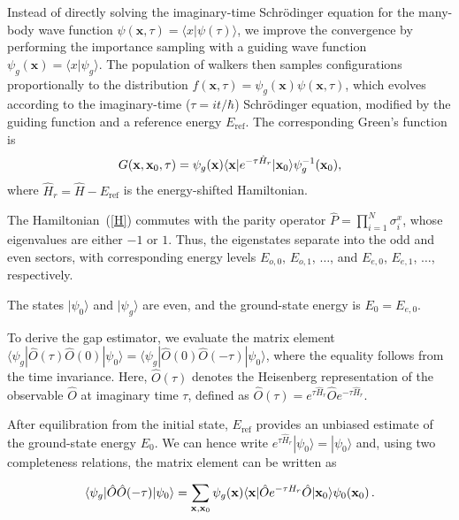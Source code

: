 \documentclass[aps,prl,twocolumn,superscriptaddress,nofootinbib]{revtex4-2}
\begin{document}
Instead of directly solving the imaginary-time Schrödinger equation for the many-body wave function $\psi({\mathbf x},\tau) = \langle x | \psi(\tau)\rangle$, we improve the convergence by performing the importance sampling with a guiding wave function $\psi_g({\mathbf x})=\langle x | \psi_g\rangle$.
The population of walkers then samples configurations proportionally to the
distribution $f({\mathbf x},\tau)=\psi_g({\mathbf x})\psi({\mathbf x},\tau)$, which evolves according to the imaginary-time ($\tau=it/\hbar$) Schrödinger equation, modified by the guiding function and a reference energy $E_{\mathrm{ref}}$.
The corresponding Green's function is
\begin{equation}
G({\mathbf x},{\mathbf x}_0,\tau)=\psi_g({\bf x})\langle{\mathbf x}|e^{-\tau \hat{H}_r}|{\mathbf x}_0\rangle \psi_g^{-1}({\bf x}_0),
\label{eqG}
\end{equation}
where $\hat{H}_r =\hat{H} - E_{\mathrm{ref}}$ is the energy-shifted Hamiltonian.

The Hamiltonian~(\ref{H}) commutes with the parity operator $\hat{P}=\prod_{i=1}^N\sigma^x_i$, whose eigenvalues are either $-1$ or $1$. Thus, the eigenstates separate into the odd and even sectors, with corresponding energy levels $E_{o,0}$, $E_{o,1}$, $\dots$, and  $E_{e,0}$, $E_{e,1}$, $\dots$, respectively.

The states $|\psi_0\rangle$ and $|\psi_g\rangle$ are even, and the ground-state energy is $E_0 = E_{e,0}$.

To derive the gap estimator, we evaluate the matrix element $\langle\psi_g|\hat{O}(\tau)\hat{O}(0)|\psi_0\rangle=\langle\psi_g|\hat{O}(0)\hat{O}(-\tau)|\psi_0\rangle$, where the equality follows from the time invariance.
Here, $\hat{O}(\tau)$ denotes the Heisenberg representation of the observable $\hat O$ at imaginary time $\tau$, defined as $\hat{O}(\tau)=e^{\tau\hat{H}_r}\hat{O}e^{-\tau\hat{H}_r}$.

After equilibration from the initial state, $E_{\mathrm{ref}}$ provides an unbiased estimate of the ground-state energy $E_0$.
We can hence write $e^{\tau\hat{H}_r}|\psi_0\rangle = |\psi_0\rangle$ and, using two completeness relations, the matrix element can be written as

\begin{equation}
\langle\psi_g|\hat{O}\hat{O}(-\tau)|\psi_0\rangle
=
\sum_{{\mathbf x},{\mathbf x}_0}  \psi_g({\bf x})\langle{\mathbf x}|\hat{O}e^{-\tau H_r}\hat{O}|{\mathbf x}_0\rangle \psi_0({\mathbf x}_0) \,.
\nonumber
\end{equation}
\end{document}
